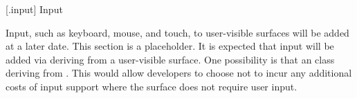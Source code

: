 
 [\iotwod.input] {Input}

\pnum
\begin{note}
Input, such as keyboard, mouse, and touch, to user-visible surfaces will be added at a later date. This section is a placeholder. It is expected that input will be added via deriving from a user-visible surface. One possibility is that an  class deriving from . This would allow developers to choose not to incur any additional costs of input support where the surface does not require user input.
\end{note}
